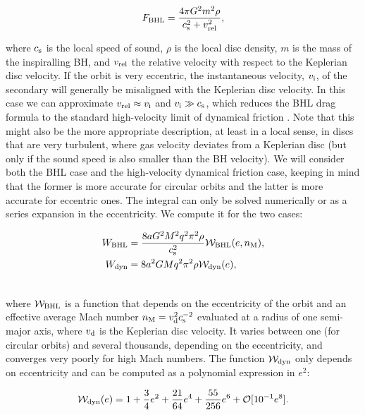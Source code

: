 \documentclass[usenatbib]{mnras}
\begin{document}
\begin{align}
F_{\rm{BHL}}= \frac{4\pi G^2 m^2 \rho}{c_{\rm s}^2 + v^2_{\rm{rel}}},
\end{align}

\noindent where $c_{\rm s}$ is the local speed of sound, $\rho$ is the local disc density, $m$ is the mass of the inspiralling BH, and $v_{\rm{rel}}$ the relative velocity with respect to the Keplerian disc velocity. If the orbit is very eccentric, the instantaneous velocity, $v_{\rm i}$, of the secondary will generally be misaligned with the Keplerian disc velocity. In this case we can approximate $v_{\rm{rel}} \approx v_{\rm i}$ and $v_{\rm i} \gg c_{\rm s}$, which reduces the BHL drag formula to the standard high-velocity limit of dynamical friction \citep[see, e.g.][for a discussion of gas effects in highly eccentric orbits]{2013CQGra..30x4008M}. Note that this might also be the more appropriate description, at least in a local sense, in discs that are very turbulent, where gas velocity deviates from a Keplerian disc (but only if the sound speed is also smaller than the BH velocity). We will consider both the BHL case and the high-velocity dynamical friction case, keeping in mind that the former is more accurate for circular orbits and the latter is more accurate for eccentric ones. The integral can only be solved numerically or as a series expansion in the eccentricity. We compute it for the two cases:

\begin{align}
    \label{eq:work}
   W_{\rm{BHL}}  &= \frac{8 a G^2 M^2 q^2 \pi^2 \rho}{c_{\rm s}^2} \mathcal{W}_{\rm{BHL}}(e,n_{\rm M}), \\
   W_{\rm{dyn}} & = 8 a^2 G M q^2 \pi^2 \rho \mathcal{W}_{\rm{dyn}}(e),\\ \nonumber
\end{align}

\noindent where $\mathcal{W}_{\rm{BHL}}$ is a function that depends on the eccentricity of the orbit and an effective average Mach number $n_{\rm M} = v_{\rm d}^2c_{\rm s}^{-2} $ evaluated at a radius of one semi-major axis, where $v_{\rm d}$ is the Keplerian disc velocity. It varies between one (for circular orbits) and several thousands, depending on the eccentricity, and converges very poorly for high Mach numbers. The function $\mathcal{W}_{\rm{dyn}}$ only depends on eccentricity and can be computed as a polynomial expression in $e^2$:

\begin{align}
    \mathcal{W}_{\rm{dyn}}(e) = 1 +\frac{3}{4}e^2 + \frac{21}{64}e^4+ \frac{55}{256}e^6 + \mathcal{O}[10^{-1}e^8].\\ \nonumber
\end{align}
\end{document}
